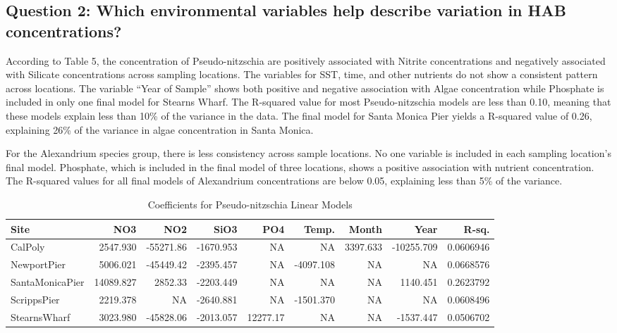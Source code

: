 \documentclass[
  12pt,
]{article}
\begin{document}
\newpage

\hypertarget{question-2-which-environmental-variables-help-describe-variation-in-hab-concentrations}{%
\subsection{Question 2: Which environmental variables help describe
variation in HAB
concentrations?}\label{question-2-which-environmental-variables-help-describe-variation-in-hab-concentrations}}

According to Table 5, the concentration of Pseudo-nitzschia are
positively associated with Nitrite concentrations and negatively
associated with Silicate concentrations across sampling locations. The
variables for SST, time, and other nutrients do not show a consistent
pattern across locations. The variable ``Year of Sample'' shows both
positive and negative association with Algae concentration while
Phosphate is included in only one final model for Stearns Wharf. The
R-squared value for most Pseudo-nitzschia models are less than 0.10,
meaning that these models explain less than 10\% of the variance in the
data. The final model for Santa Monica Pier yields a R-squared value of
0.26, explaining 26\% of the variance in algae concentration in Santa
Monica.

For the Alexandrium species group, there is less consistency across
sample locations. No one variable is included in each sampling
location's final model. Phosphate, which is included in the final model
of three locations, shows a positive association with nutrient
concentration. The R-squared values for all final models of Alexandrium
concentrations are below 0.05, explaining less than 5\% of the variance.

\begingroup\fontsize{9}{11}\selectfont

\begin{longtable}[t]{lrrrrrrrr}
\caption{\label{tab:LM Output Tables}Coefficients for Pseudo-nitzschia Linear Models}\\
\toprule
Site & NO3 & NO2 & SiO3 & PO4 & Temp. & Month & Year & R-sq.\\
\midrule
CalPoly & 2547.930 & -55271.86 & -1670.953 & NA & NA & 3397.633 & -10255.709 & 0.0606946\\
NewportPier & 5006.021 & -45449.42 & -2395.457 & NA & -4097.108 & NA & NA & 0.0668576\\
SantaMonicaPier & 14089.827 & 2852.33 & -2203.449 & NA & NA & NA & 1140.451 & 0.2623792\\
ScrippsPier & 2219.378 & NA & -2640.881 & NA & -1501.370 & NA & NA & 0.0608496\\
StearnsWharf & 3023.980 & -45828.06 & -2013.057 & 12277.17 & NA & NA & -1537.447 & 0.0506702\\
\bottomrule
\end{longtable}
\endgroup{}
\end{document}
